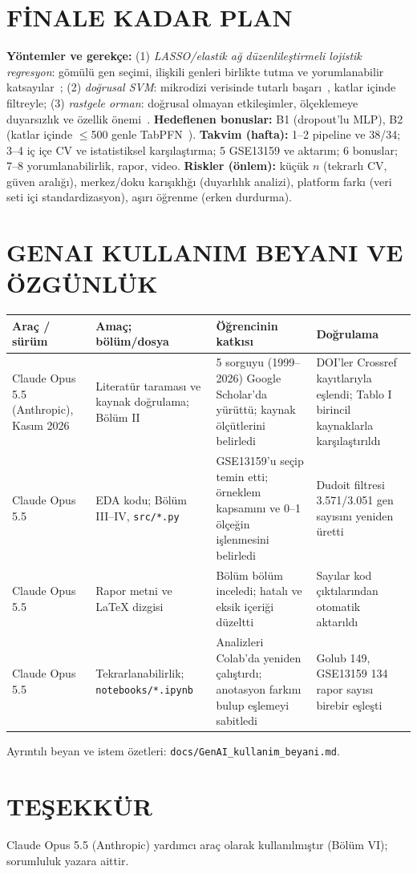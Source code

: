 \documentclass[conference]{IEEEtran}
\begin{document}
\section{FİNALE KADAR PLAN}
\textbf{Yöntemler ve gerekçe:} (1) \emph{LASSO/elastik ağ düzenlileştirmeli lojistik regresyon}: gömülü gen seçimi, ilişkili genleri birlikte tutma ve yorumlanabilir katsayılar~\cite{zou2005}; (2) \emph{doğrusal SVM}: mikrodizi verisinde tutarlı başarı~\cite{furey2000,statnikov2008}, katlar içinde filtreyle; (3) \emph{rastgele orman}: doğrusal olmayan etkileşimler, ölçeklemeye duyarsızlık ve özellik önemi~\cite{diaz2006}. \textbf{Hedeflenen bonuslar:} B1 (dropout'lu MLP), B2 (katlar içinde $\le$500 genle TabPFN~\cite{hollmann2025}). \textbf{Takvim (hafta):} 1--2 pipeline ve 38/34; 3--4 iç içe CV ve istatistiksel karşılaştırma; 5 GSE13159 ve aktarım; 6 bonuslar; 7--8 yorumlanabilirlik, rapor, video. \textbf{Riskler (önlem):} küçük $n$ (tekrarlı CV, güven aralığı), merkez/doku karışıklığı (duyarlılık analizi), platform farkı (veri seti içi standardizasyon), aşırı öğrenme (erken durdurma).

\section{GENAI KULLANIM BEYANI VE ÖZGÜNLÜK}
\begin{table}[!h]
\centering\scriptsize\setlength{\tabcolsep}{2pt}
\begin{tabularx}{\columnwidth}{@{}p{1.5cm}p{1.9cm}X X@{}}
\toprule
\textbf{Araç / sürüm} & \textbf{Amaç; bölüm/dosya} & \textbf{Öğrencinin katkısı} & \textbf{Doğrulama}\\
\midrule
Claude Opus 5.5 (Anthropic), Kasım 2026 & Literatür taraması ve kaynak doğrulama; Bölüm II & 5 sorguyu (1999--2026) Google Scholar'da yürüttü; kaynak ölçütlerini belirledi & DOI'ler Crossref kayıtlarıyla eşlendi; Tablo I birincil kaynaklarla karşılaştırıldı\\
Claude Opus 5.5 & EDA kodu; Bölüm III--IV, \texttt{src/*.py} & GSE13159'u seçip temin etti; örneklem kapsamını ve 0--1 ölçeğin işlenmesini belirledi & Dudoit filtresi 3.571/3.051 gen sayısını yeniden üretti\\
Claude Opus 5.5 & Rapor metni ve LaTeX dizgisi & Bölüm bölüm inceledi; hatalı ve eksik içeriği düzeltti & Sayılar kod çıktılarından otomatik aktarıldı\\
Claude Opus 5.5 & Tekrarlanabilirlik; \texttt{notebooks/*.ipynb} & Analizleri Colab'da yeniden çalıştırdı; anotasyon farkını bulup eşlemeyi sabitledi & Golub 149, GSE13159 134 rapor sayısı birebir eşleşti\\
\bottomrule
\end{tabularx}
\end{table}
Ayrıntılı beyan ve istem özetleri: \texttt{docs/GenAI\_kullanim\_beyani.md}.

\section*{TEŞEKKÜR}
Claude Opus 5.5 (Anthropic) yardımcı araç olarak kullanılmıştır (Bölüm VI); sorumluluk yazara aittir.


{\footnotesize}
\end{document}
